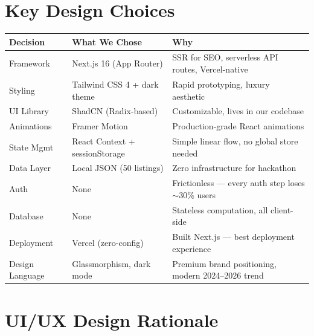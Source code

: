 \documentclass[11pt,a4paper]{article}
\begin{document}
\section{Key Design Choices}

\begin{table}[h]
\centering
\small
\begin{tabular}{@{}p{3.2cm}p{5cm}p{5.5cm}@{}}
\toprule
\textbf{Decision} & \textbf{What We Chose} & \textbf{Why} \\
\midrule
Framework & Next.js 16 (App Router) & SSR for SEO, serverless API routes, Vercel-native \\
Styling & Tailwind CSS 4 + dark theme & Rapid prototyping, luxury aesthetic \\
UI Library & ShadCN (Radix-based) & Customizable, lives in our codebase \\
Animations & Framer Motion & Production-grade React animations \\
State Mgmt & React Context + sessionStorage & Simple linear flow, no global store needed \\
Data Layer & Local JSON (50 listings) & Zero infrastructure for hackathon \\
Auth & None & Frictionless --- every auth step loses $\sim$30\% users \\
Database & None & Stateless computation, all client-side \\
Deployment & Vercel (zero-config) & Built Next.js --- best deployment experience \\
Design Language & Glassmorphism, dark mode & Premium brand positioning, modern 2024--2026 trend \\
\bottomrule
\end{tabular}
\end{table}

\section{UI/UX Design Rationale}
\end{document}
